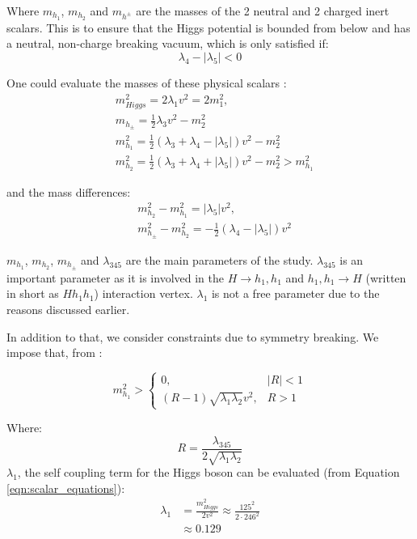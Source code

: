 \documentclass[12pt]{article}
\begin{document}
Where $m_{h_1}$, $m_{h_2}$ and $m_{h^\pm}$ are the masses of the 2 neutral and 2 charged inert scalars. This is to ensure that the Higgs potential is bounded from below and has a neutral, non-charge breaking vacuum, which is only satisfied if:
\begin{equation}
    \lambda_4 - |\lambda_5| < 0
\end{equation}

One could evaluate the masses of these physical scalars \cite{Belyaev:2016lok}:
\begin{align}
    \label{eqn:scalar_equations}
    &m_{Higgs}^2 = 2\lambda_1v^2 = 2m^2_1,\\
    &m_{h_\pm} = \frac{1}{2}\lambda_3v^2-m^2_2 \\
    \label{eqn:massdmscalar}
    &m_{h_1}^2 = \frac{1}{2}(\lambda_3 + \lambda_4 - |\lambda_5|)v^2 - m_2^2\\
    &m_{h_2}^2 = \frac{1}{2}(\lambda_3 + \lambda_4 + |\lambda_5|)v^2 - m_2^2 > m^2_{h_1}
\end{align}

and the mass differences: 
\begin{align}
    &m_{h_2}^2 - m_{h_1}^2 =  |\lambda_5|v^2, \\
    &m_{h_\pm}^2 - m_{h_2}^2 = -\frac{1}{2}(\lambda_4 - |\lambda_5|)v^2
\end{align}

$m_{h_1}$, $m_{h_2}$, $m_{h_\pm}$ and $\lambda_{345}$ are the main parameters of the study. $\lambda_{345}$ is an important parameter as it is involved in the $H\rightarrow h_1,h_1$ and $h_1,h_1 \rightarrow H$ (written in short as $Hh_1h_1$) interaction vertex. $\lambda_1$ is not a free parameter due to the reasons discussed earlier.

In addition to that, we consider constraints due to symmetry breaking. We impose that, from \cite{Belyaev:2016lok, Ginzburg2010}:

\begin{equation}
    m_{h_1}^2 >
        \begin{cases}
         0, & |R| < 1\\
         (R-1) \sqrt{\lambda_1\lambda_2} v^2, & R>1
        \end{cases}
        \label{eqn:R}
\end{equation}

Where:
\begin{equation}
    R = \frac{\lambda_{345}}{2\sqrt{\lambda_1\lambda_2}}
\end{equation}
$\lambda_1$, the self coupling term for the Higgs boson can be evaluated (from Equation \ref{eqn:scalar_equations}):
\begin{equation}
    \begin{split}
        \lambda_1 &= \frac{m^2_{Higgs}}{2 v^2}
                \approx\frac{125^2}{2\cdot 246 ^ 2} \\
                &\approx0.129
    \end{split}
\end{equation}
\end{document}

